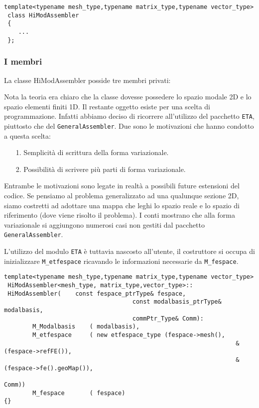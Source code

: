  \begin{lstlisting}[style = general]
 template<typename mesh_type,typename matrix_type,typename vector_type>
 class HiModAssembler
 {
	... 
 };
 \end{lstlisting}
 
\subsubsection{I membri}
La classe HiModAssembler posside tre membri privati:


Nota la teoria era chiaro che la classe dovesse possedere lo spazio modale 2D e lo spazio elementi finiti 1D.
Il restante oggetto esiste per una scelta di programmazione. Infatti abbiamo deciso di ricorrere all'utilizzo del pacchetto \texttt{ETA}, piuttosto che del \texttt{GeneralAssembler}. Due sono le motivazioni che hanno condotto a questa scelta:
\begin{itemize}
\item[1.] Semplicit\`a di scrittura della forma variazionale.
\item[2.] Possibilit\`a di scrivere pi\`u parti di forma variazionale.
\end{itemize}

Entrambe le motivazioni sono legate in realt\`a a possibili future estensioni del codice. Se pensiamo al problema generalizzato ad una qualunque sezione 2D, siamo costretti ad adottare una mappa che leghi lo spazio reale e lo spazio di riferimento (dove viene risolto il problema). I conti mostrano che alla forma variazionale si aggiungono numerosi casi non gestiti dal pacchetto \texttt{GeneralAssembler}.

L'utilizzo del modulo \texttt{ETA} \`e tuttavia nascosto all'utente, il costruttore si occupa di inizializzare \texttt{M\_etfespace} ricavando le informazioni necessarie da \texttt{M\_fespace}.

\begin{lstlisting}[style=general]
 template<typename mesh_type,typename matrix_type,typename vector_type>
 HiModAssembler<mesh_type, matrix_type,vector_type>::
 HiModAssembler(	const fespace_ptrType& fespace,
 									const modalbasis_ptrType& modalbasis,
 									commPtr_Type& Comm):
 		M_Modalbasis	( modalbasis),
 		M_etfespace 	( new etfespace_type (fespace->mesh(),
 																 &(fespace->refFE()),
 																 &(fespace->fe().geoMap()),
 																 Comm))
		M_fespace		( fespace)
{} 																 
 																
\end{lstlisting}

